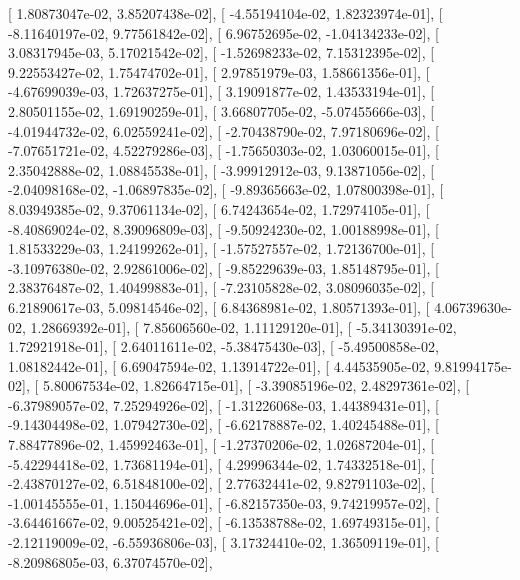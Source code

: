 \documentclass{article}
\begin{document}
       [  1.80873047e-02,   3.85207438e-02],
       [ -4.55194104e-02,   1.82323974e-01],
       [ -8.11640197e-02,   9.77561842e-02],
       [  6.96752695e-02,  -1.04134233e-02],
       [  3.08317945e-03,   5.17021542e-02],
       [ -1.52698233e-02,   7.15312395e-02],
       [  9.22553427e-02,   1.75474702e-01],
       [  2.97851979e-03,   1.58661356e-01],
       [ -4.67699039e-03,   1.72637275e-01],
       [  3.19091877e-02,   1.43533194e-01],
       [  2.80501155e-02,   1.69190259e-01],
       [  3.66807705e-02,  -5.07455666e-03],
       [ -4.01944732e-02,   6.02559241e-02],
       [ -2.70438790e-02,   7.97180696e-02],
       [ -7.07651721e-02,   4.52279286e-03],
       [ -1.75650303e-02,   1.03060015e-01],
       [  2.35042888e-02,   1.08845538e-01],
       [ -3.99912912e-03,   9.13871056e-02],
       [ -2.04098168e-02,  -1.06897835e-02],
       [ -9.89365663e-02,   1.07800398e-01],
       [  8.03949385e-02,   9.37061134e-02],
       [  6.74243654e-02,   1.72974105e-01],
       [ -8.40869024e-02,   8.39096809e-03],
       [ -9.50924230e-02,   1.00188998e-01],
       [  1.81533229e-03,   1.24199262e-01],
       [ -1.57527557e-02,   1.72136700e-01],
       [ -3.10976380e-02,   2.92861006e-02],
       [ -9.85229639e-03,   1.85148795e-01],
       [  2.38376487e-02,   1.40499883e-01],
       [ -7.23105828e-02,   3.08096035e-02],
       [  6.21890617e-03,   5.09814546e-02],
       [  6.84368981e-02,   1.80571393e-01],
       [  4.06739630e-02,   1.28669392e-01],
       [  7.85606560e-02,   1.11129120e-01],
       [ -5.34130391e-02,   1.72921918e-01],
       [  2.64011611e-02,  -5.38475430e-03],
       [ -5.49500858e-02,   1.08182442e-01],
       [  6.69047594e-02,   1.13914722e-01],
       [  4.44535905e-02,   9.81994175e-02],
       [  5.80067534e-02,   1.82664715e-01],
       [ -3.39085196e-02,   2.48297361e-02],
       [ -6.37989057e-02,   7.25294926e-02],
       [ -1.31226068e-03,   1.44389431e-01],
       [ -9.14304498e-02,   1.07942730e-02],
       [ -6.62178887e-02,   1.40245488e-01],
       [  7.88477896e-02,   1.45992463e-01],
       [ -1.27370206e-02,   1.02687204e-01],
       [ -5.42294418e-02,   1.73681194e-01],
       [  4.29996344e-02,   1.74332518e-01],
       [ -2.43870127e-02,   6.51848100e-02],
       [  2.77632441e-02,   9.82791103e-02],
       [ -1.00145555e-01,   1.15044696e-01],
       [ -6.82157350e-03,   9.74219957e-02],
       [ -3.64461667e-02,   9.00525421e-02],
       [ -6.13538788e-02,   1.69749315e-01],
       [ -2.12119009e-02,  -6.55936806e-03],
       [  3.17324410e-02,   1.36509119e-01],
       [ -8.20986805e-03,   6.37074570e-02],
\end{document}
